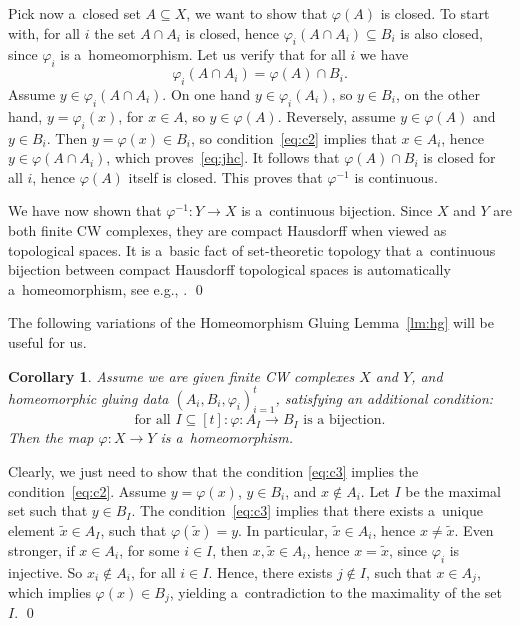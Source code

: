 \documentclass{amsart}[10pt]
\newtheorem{crl}[theorem]{Corollary}
\newcommand{\pr}{\nin{\bf Proof.} }
\numberwithin{equation}{section}
\numberwithin{figure}{section}
\numberwithin{table}{section}
\begin{document}
Pick now a~closed set $A\subseteq X$, we want to show that
$\varphi(A)$ is closed.  To start with, for all $i$ the set $A\cap
A_i$ is closed, hence $\varphi_i(A\cap A_i)\subseteq B_i$ is also
closed, since $\varphi_i$ is a~homeomorphism.  Let us verify that for
all $i$ we have
\begin{equation}\label{eq:jhc}
\varphi_i(A\cap A_i)=\varphi(A)\cap B_i.
\end{equation} 
Assume $y\in\varphi_i(A\cap A_i)$. On one hand $y\in\varphi_i(A_i)$,
so $y\in B_i$, on the other hand, $y=\varphi_i(x)$, for $x\in A$, so
$y\in\varphi(A)$. Reversely, assume $y\in\varphi(A)$ and $y\in
B_i$. Then $y=\varphi(x)\in B_i$, so condition~\eqref{eq:c2} implies
that $x\in A_i$, hence $y\in\varphi(A\cap A_i)$, which
proves~\eqref{eq:jhc}. It follows that $\varphi(A)\cap B_i$ is closed
for all $i$, hence $\varphi(A)$ itself is closed. This proves that
$\varphi^{-1}$ is continuous.

We have now shown that $\varphi^{-1}:Y\rightarrow X$ is a~continuous
bijection.  Since $X$ and $Y$ are both finite CW complexes, they are
compact Hausdorff when viewed as topological spaces.  It is a~basic
fact of set-theoretic topology that a~continuous bijection between
compact Hausdorff topological spaces is automatically a~homeomorphism,
see e.g., \cite[Theorem 26.6]{Mun}.  \qed

\vspace{5pt}

The following variations of the Homeomorphism Gluing Lemma~\ref{lm:hg}
will be useful for us. 

\begin{crl} \label{crl:hg}
 Assume we are given finite CW complexes $X$ and $Y$, and
homeomorphic gluing data $(A_i,B_i,\varphi_i)_{i=1}^t$, satisfying an
additional condition:
\begin{equation} \label{eq:c3}
\textrm{ for all } I\subseteq[t]: \varphi:A_I\rightarrow B_I
\textrm{ is a~bijection. }
\end{equation}
Then the map $\varphi:X\rightarrow Y$ is a~homeomorphism.
\end{crl}
\pr Clearly, we just need to show that the condition \eqref{eq:c3}
implies the condition~\eqref{eq:c2}. Assume $y=\varphi(x)$, $y\in
B_i$, and $x\not\in A_i$. Let $I$ be the maximal set such that $y\in
B_I$. The condition~\eqref{eq:c3} implies that there exists a~unique
element $\tilde x\in A_I$, such that $\varphi(\tilde x)=y$. In
particular, $\tilde x\in A_i$, hence $x\neq\tilde x$. Even stronger,
if $x\in A_i$, for some $i\in I$, then $x,\tilde x\in A_i$, hence
$x=\tilde x$, since $\varphi_i$ is injective. So $x_i\not\in A_i$, for
all $i\in I$. Hence, there exists $j\not\in I$, such that $x\in A_j$,
which implies $\varphi(x)\in B_j$, yielding a~contradiction to the
maximality of the set~$I$. \qed
\end{document}
